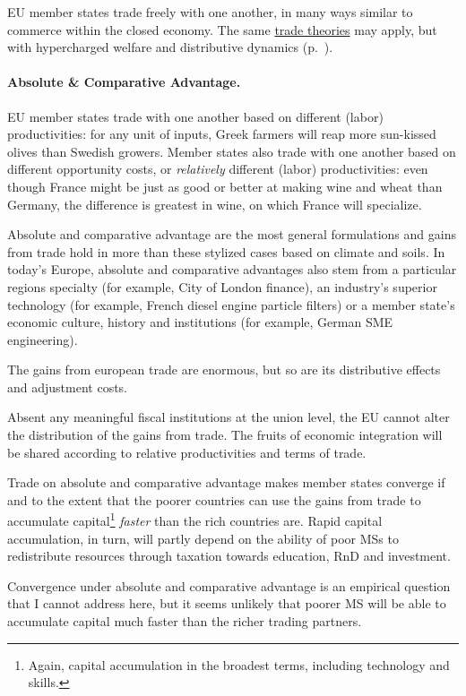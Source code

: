 \gls{EU} member states trade freely with one another, in many ways similar to commerce within the closed economy. The same \hyperref[sec:space]{trade theories} may apply, but with hypercharged welfare and distributive dynamics (p.~\pageref{sec:space}).

\paragraph{Absolute \& Comparative Advantage.} \gls{EU} member states trade with one another based on different (labor) productivities: for any unit of inputs, Greek farmers will reap more sun-kissed olives than Swedish growers. Member states also trade with one another based on different opportunity costs, or \emph{relatively} different (labor) productivities: even though France might be just as good or better at making wine and wheat than Germany, the difference is greatest in wine, on which France will specialize.

Absolute and comparative advantage are the most general formulations and gains from trade hold in more than these stylized cases based on climate and soils. In today's Europe, absolute and comparative advantages also stem from a particular regions specialty (for example, City of London finance), an industry's superior technology (for example, French diesel engine particle filters) or a member state's economic culture, history and institutions (for example, German \gls{SME} engineering).

The gains from european trade are enormous, but so are its distributive effects and adjustment costs.

Absent any meaningful fiscal institutions at the union level, the \gls{EU} cannot alter the distribution of the gains from trade. The fruits of economic integration will be shared according to relative productivities and terms of trade.

Trade on absolute and comparative advantage makes member states converge if and to the extent that the poorer countries can use the gains from trade to accumulate capital\footnote{
	Again, capital accumulation in the broadest terms, including technology and skills.}
\emph{faster} than the rich countries are. Rapid capital accumulation, in turn, will partly depend on the ability of poor \glspl{MS} to redistribute resources through taxation towards education, \gls{RnD} and investment.

Convergence under absolute and comparative advantage is an empirical question that I cannot address here, but it seems unlikely that poorer \gls{MS} will be able to accumulate capital much faster than the richer trading partners.

